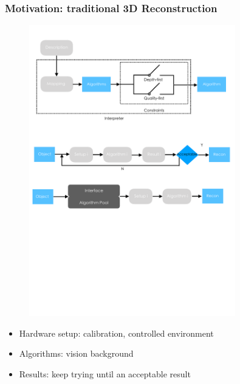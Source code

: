 \documentclass{beamer}
\begin{document}
\begin{frame}
\frametitle{Motivation: traditional 3D Reconstruction}

\begin{figure}
\centering
\includegraphics[width=0.8\textwidth]{images/traditional_3d_vision.pdf}
\end{figure}

\begin{itemize}
\item Hardware setup: calibration, controlled environment
\item Algorithms: vision background
\item Results: keep trying until an acceptable result
\end{itemize}

\end{frame}
\end{document}
